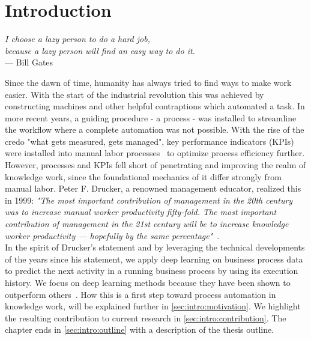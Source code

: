 \chapter{Introduction}\label{sec:intro}
\begin{flushright}{\slshape
I choose a lazy person to do a hard job,\\
because a lazy person will find an easy way to do it.}\\
\medskip
--- Bill Gates
\end{flushright}

\noindent Since the dawn of time, humanity has always tried to find ways to make work easier. With the start of the industrial revolution this was achieved by constructing machines and other helpful contraptions which automated a task. In more recent years, a guiding procedure - a process - was installed to streamline the workflow where a complete automation was not possible. With the rise of the credo "what gets measured, gets managed", key performance indicators (KPIs) were installed into manual labor processes~\cite{web:taylorism-and-drucker} to optimize process efficiency further.\\

However, processes and KPIs fell short of penetrating and improving the realm of knowledge work, since the foundational mechanics of it differ strongly from manual labor. Peter F. Drucker, a renowned management educator, realized this in 1999:
{\slshape"The most important contribution of management in the 20th century was to increase manual worker productivity fifty-fold. The most important contribution of management in the 21st century will be to increase knowledge worker productivity — hopefully by the same percentage"}~\cite{drucker1999}.\\

In the spirit of Drucker's statement and by leveraging the technical developments of the years since his statement, we apply deep learning on business process data to predict the next activity in a running business process by using its execution history. We focus on deep learning methods because they have been shown to outperform others~\cite{tax2018interdisciplinary}. How this is a first step toward process automation in knowledge work, will be explained further in \autoref{sec:intro:motivation}.  We highlight the resulting contribution to current research in \autoref{sec:intro:contribution}. The chapter ends in \autoref{sec:intro:outline} with a description of the thesis outline.

